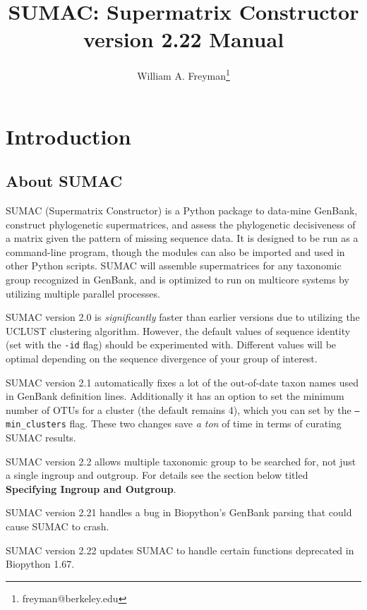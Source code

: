 \documentclass[10pt]{report}
\title{SUMAC: Supermatrix Constructor version 2.22 Manual}
\author{William A. Freyman\thanks{freyman@berkeley.edu}}
\affil{Department of Integrative Biology, University of California, Berkeley}
\date{}
\begin{document}
\maketitle

\tableofcontents


\chapter{Introduction}

\section{About SUMAC}

SUMAC (Supermatrix Constructor) is a Python package to 
data-mine GenBank, construct phylogenetic supermatrices, and assess the phylogenetic decisiveness of a matrix given the pattern of missing sequence data.
It is designed to be run as a command-line program, though
the modules can also be imported and used in other Python scripts.
SUMAC will assemble
supermatrices for any taxonomic group recognized in GenBank,
and is optimized to run on multicore systems by utilizing multiple parallel processes.

SUMAC version 2.0 is \textit{significantly} faster than earlier versions
due to utilizing the UCLUST clustering algorithm. However, the
default values of sequence identity (set with the \texttt{-id} flag)
should be experimented with. Different values will be optimal
depending on the sequence divergence of your group of interest.

SUMAC version 2.1 
automatically fixes a lot of the out-of-date taxon names used in GenBank definition lines. 
Additionally it has an option to set the minimum number of OTUs for a cluster (the default remains 4), 
which you can set by the \texttt{--min\_clusters} flag. 
These two changes save \textit{a ton} of time in terms of curating SUMAC results.

SUMAC version 2.2
allows multiple taxonomic group to be searched for,
not just a single ingroup and outgroup.
For details see the section below titled 
\textbf{Specifying Ingroup and Outgroup}.

SUMAC version 2.21
handles a bug in Biopython's GenBank parsing that could cause
SUMAC to crash.

SUMAC version 2.22
updates SUMAC to handle certain functions deprecated in Biopython 1.67.
\end{document}
